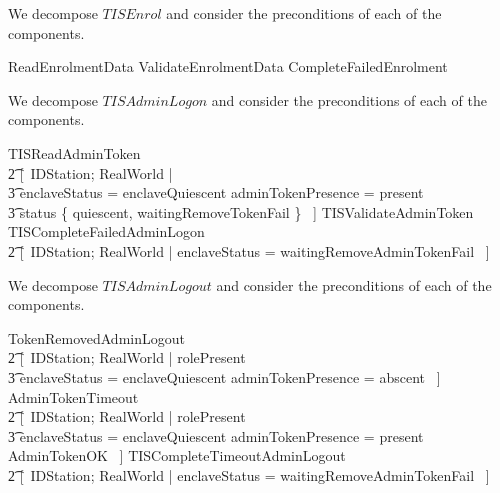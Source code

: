 We decompose $TISEnrol$ and consider the preconditions of each of
the components.

\begin{argue}
        \pre ReadEnrolmentData \equiv 
         [~IDStation; RealWorld | enclaveStatus = notEnrolled  ~]
\also
        \pre ValidateEnrolmentData \equiv 
         [~IDStation; RealWorld | enclaveStatus = waitingEnrol  ~]
\also
        \pre CompleteFailedEnrolment \equiv 
         [~IDStation; RealWorld | enclaveStatus = waitingEndEnrol  ~]
\end{argue}

We decompose $TISAdminLogon$ and consider the preconditions of each of
the components.

\begin{argue}
        \pre TISReadAdminToken \equiv 
\\      \t2 [~IDStation; RealWorld |
\\      \t3      enclaveStatus = enclaveQuiescent \land adminTokenPresence = present 
\\ \t3          \land status \in \{ quiescent, waitingRemoveTokenFail \} ~]
\also
        \pre TISValidateAdminToken \equiv 
         [~IDStation; RealWorld | enclaveStatus = gotAdminToken  ~]
\also
        \pre TISCompleteFailedAdminLogon \equiv 
\\      \t2 [~IDStation; RealWorld | enclaveStatus = waitingRemoveAdminTokenFail  ~]
\end{argue}
We decompose $TISAdminLogout$ and consider the preconditions of each of
the components.
\begin{argue}
        \pre TokenRemovedAdminLogout \equiv 
\\      \t2 [~IDStation; RealWorld | rolePresent \neq \Nil
\\      \t3     \land enclaveStatus = enclaveQuiescent \land adminTokenPresence = abscent 
         ~]
\also
        \pre AdminTokenTimeout \equiv 
\\      \t2 [~IDStation; RealWorld | rolePresent \neq \Nil
\\      \t3     \land enclaveStatus = enclaveQuiescent \land
adminTokenPresence = present \land \lnot AdminTokenOK 
         ~]
\also
        \pre TISCompleteTimeoutAdminLogout \equiv 
\\      \t2 [~IDStation; RealWorld |  enclaveStatus = waitingRemoveAdminTokenFail  ~]
\end{argue}


